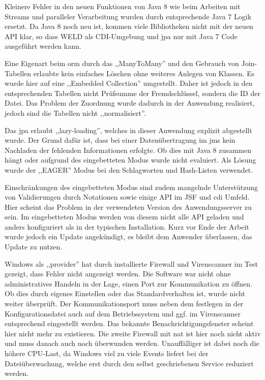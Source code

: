 \documentclass[oneside, ngerman, toc=bibliography,bibliography=totoc,listof=entryprefix, open=right,numbers=noenddot,fontsize=12pt]{scrbook}
\begin{document}
Kleinere Fehler in den neuen Funktionen von Java 8 wie beim Arbeiten mit Streams und paralleler Verarbeitung wurden durch entsprechende Java 7 Logik ersetzt. Da Java 8 noch neu ist, kommen viele Bibliotheken nicht mit der neuen API klar, so dass WELD als CDI-Umgebung und \acrshort{jpa} nur mit Java 7 Code ausgeführt werden kann.

Eine Eigenart beim \acrshort{orm} durch das ,,ManyToMany'' und den Gebrauch von Join-Tabellen  erlaubte kein einfaches Löschen ohne weiteres Anlegen von Klassen. Es wurde hier auf eine ,,Embedded Collection'' umgestellt. Daher ist jedoch in den entsprechenden Tabellen nicht Prüfsumme der Fremdschlüssel, sondern die ID der Datei. Das Problem der Zuordnung wurde dadurch in der Anwendung realisiert, jedoch sind die Tabellen nicht ,,normalisiert''.

Das \acrshort{jpa}  erlaubt ,,lazy-loading'', welches in dieser Anwendung explizit  abgestellt wurde.
Der Grund dafür ist, dass bei einer Datenübertragung im \acrshort{jms}  kein Nachladen der fehlenden Informationen erfolgte. Ob dies mit Java 8 zusammen hängt oder aufgrund des eingebetteten Modus wurde nicht evaluiert. Als Lösung wurde der ,,EAGER'' Modus bei den Schlagworten und Hash-Listen verwendet.

Einschränkungen des eingebetteten Modus sind zudem mangelnde Unterstützung von Validierungen durch Notationen sowie einige API im JSF und \acrshort{cdi} Umfeld.
Hier scheint das Problem in der verwendeten Version des Anwendungsserver zu sein. Im eingebetteten Modus werden von diesem nicht alle API geladen und anders konfiguriert als in der typischen Installation. Kurz vor Ende der Arbeit wurde jedoch ein Update angekündigt, es bleibt dem Anwender überlassen, das Update zu nutzen.


Windows als ,,provider'' hat durch installierte Firewall und Virenscanner im Test gezeigt, dass Fehler nicht angezeigt werden. Die Software war nicht ohne administratives Handeln in der Lage, einen Port zur Kommunikation zu öffnen. Ob dies durch eigenes Einstellen oder das Standardverhalten ist, wurde nicht weiter überprüft. Der Kommunikationsport muss neben dem festlegen in der Konfigurationsdatei auch auf dem Betriebssystem und ggf. im Virenscanner entsprechend eingestellt werden. Das bekannte Benachrichtigungsfenster scheint hier nicht mehr zu existieren. Die zweite Firewall mit  \acrshort{nat} ist hier noch nicht aktiv und muss danach auch noch überwunden werden. Unauffälliger ist dabei noch die höhere CPU-Last, da Windows viel zu viele Events liefert bei der Dateiüberwachung, welche erst durch den selbst geschriebenen Service reduziert werden.
\end{document}
